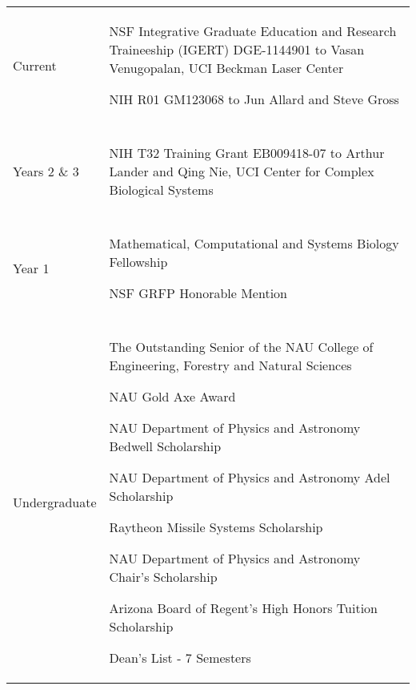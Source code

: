 \documentclass[letterpaper,10pt]{article} %
\makeatletter
\newcommand\cellwidth{\TX@col@width}
\makeatother
\begin{document}
\begin{tabularx}{\textwidth}{>{\raggedleft}p{} | X}

Current &
\begin{minipage}{\cellwidth}
\begin{description}[itemsep=.25ex,labelsep=0em]
\item NSF Integrative Graduate Education and Research Traineeship (IGERT) DGE-1144901 to Vasan Venugopalan, UCI Beckman Laser Center
\item NIH R01 GM123068 to Jun Allard and Steve Gross
\end{description}
\end{minipage} \\

\multicolumn{2}{c}{} \\

Years 2 \& 3 &
\begin{minipage}{\cellwidth}
\begin{description}[itemsep=.25ex,labelsep=0em]
\item NIH T32 Training Grant EB009418-07 to Arthur Lander and Qing Nie, UCI Center for Complex Biological Systems
\end{description}
\end{minipage} \\

\multicolumn{2}{c}{} \\

Year 1 &
\begin{minipage}{\cellwidth}
\begin{description}[itemsep=.25ex,labelsep=0em]
\item Mathematical, Computational and Systems Biology Fellowship
\item NSF GRFP Honorable Mention
\end{description}
\end{minipage} \\

\multicolumn{2}{c}{} \\
 
Undergraduate & 
\begin{minipage}{\cellwidth}
\begin{description}[itemsep=.25ex,labelsep=0em]
\item The Outstanding Senior of the NAU College of Engineering, Forestry and Natural Sciences 
\item NAU Gold Axe Award
\item NAU Department of Physics and Astronomy Bedwell Scholarship 
\item NAU Department of Physics and Astronomy Adel Scholarship 
\item Raytheon Missile Systems Scholarship 
\item NAU Department of Physics and Astronomy Chair's Scholarship 
\item Arizona Board of Regent's High Honors Tuition Scholarship 
\item Dean's List - 7 Semesters
\end{description}
\end{minipage}
\end{tabularx}
\end{document}
